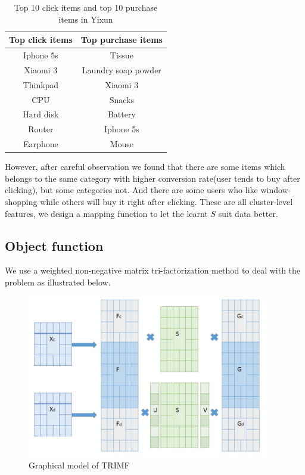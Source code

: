 \begin{table}[h]

\label{tbl:topitem}
\begin{center}
\begin{tabular}{| c | c |}
\hline
Top click items & Top purchase items \\
\hline
Iphone 5s & Tissue\\
Xiaomi 3 & Laundry soap powder\\
Thinkpad & Xiaomi 3\\
CPU & Snacks\\
Hard disk & Battery\\
Router & Iphone 5s\\
Earphone & Mouse\\
\hline
\end{tabular}
\caption{Top 10 click items and top 10 purchase items in Yixun}
\end{center}
\end{table}

\par{However, after careful observation we found that there are some items which belongs to the same category with higher conversion rate(user tends to buy after clicking), but some categories not. And there are some users who like window-shopping while others will buy it right after clicking. These are all cluster-level features, we design a mapping function to let the learnt $S$ suit data better.}

\subsection{Object function}
\par{We use a weighted non-negative matrix tri-factorization method to deal with the problem as illustrated below. 
\begin{figure}


\begin{center}
\includegraphics[width=400px]{fig/trimf.jpg} 
\caption{Graphical model of TRIMF}
\label{fig:trimf}
\end{center}
\end{figure}}
 

